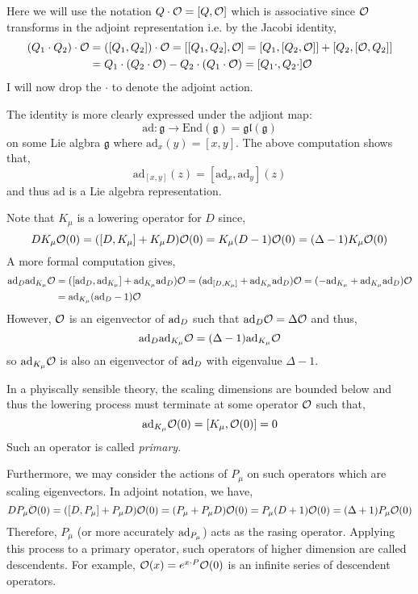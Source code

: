 \documentclass[12pt]{extarticle}
\begin{document}
Here we will use the notation $Q \cdot \mathcal{O} = [Q, \mathcal{O}]$ which is associative since $\mathcal{O}$ transforms in the adjoint representation i.e. by the Jacobi identity,
\begin{align*}
(Q_1 \cdot Q_2) \cdot \mathcal{O} & = ([Q_1, Q_2]) \cdot \mathcal{O} = [[Q_1, Q_2], \mathcal{O}] = [Q_1, [Q_2, \mathcal{O}]] + [Q_2, [\mathcal{O}, Q_2]] 
\\
& = Q_1 \cdot (Q_2 \cdot \mathcal{O}) -  Q_2 \cdot (Q_1 \cdot \mathcal{O}) = [Q_1 \cdot, Q_2 \cdot ] \mathcal{O}
\end{align*}
I will now drop the $\cdot$ to denote the adjoint action. 
\begin{remark}
The identity is more clearly expressed under the adjiont map:
\[ \mathrm{ad} : \mathfrak{g} \to \mathrm{End}(\mathfrak{g}) = \mathfrak{gl}(\mathfrak{g}) \]
on some Lie algbra $\mathfrak{g}$ where $\mathrm{ad}_x(y) = [x,y]$. The above computation shows that,
\[ \mathrm{ad}_{[x,y]}(z) = [\mathrm{ad}_x, \mathrm{ad}_y](z)  \]
and thus $\mathrm{ad}$ is a Lie algebra representation. 
\end{remark} 
Note that $K_\mu$ is a lowering operator for $D$ since,
\[ D K_\mu \mathcal{O}(0) = ([D, K_\mu] + K_\mu D) \mathcal{O}(0) = K_\mu (D - 1) \mathcal{O}(0) = (\Delta - 1) K_\mu \mathcal{O}(0) \]
A more formal computation gives,
\begin{align*}
\mathrm{ad}_{D} \mathrm{ad}_{K_\mu} \mathcal{O} & = ([\mathrm{ad}_{D}, \mathrm{ad}_{K_\mu}] + \mathrm{ad}_{K_\mu} \mathrm{ad}_{D}) \mathcal{O} = (\mathrm{ad}_{[D, K_\mu]} + \mathrm{ad}_{K_\mu} \mathrm{ad}_{D}) \mathcal{O} = (-\mathrm{ad}_{K_\mu} + \mathrm{ad}_{K_\mu} \mathrm{ad}_{D}) \mathcal{O}
\\
& = \mathrm{ad}_{K_\mu} (\mathrm{ad}_{D} - 1) \mathcal{O}
\end{align*}
However, $\mathcal{O}$ is an eigenvector of $\mathrm{ad}_{D}$ such that $\mathrm{ad}_{D} \mathcal{O} = \Delta \mathcal{O}$ and thus,
\[ \mathrm{ad}_{D} \mathrm{ad}_{K_\mu} \mathcal{O} = (\Delta - 1) \mathrm{ad}_{K_\mu} \mathcal{O} \]
so $\mathrm{ad}_{K_\mu} \mathcal{O}$ is also an eigenvector of $\mathrm{ad}_{D}$ with eigenvalue $\Delta - 1$. 
\begin{definition}
In a phyiscally sensible theory, the scaling dimensions are bounded below and thus the lowering process must terminate at some operator $\mathcal{O}$ such that,
\[ \mathrm{ad}_{K_\mu} \mathcal{O}(0) = [K_\mu, \mathcal{O}(0)] = 0 \]
Such an operator is called \textit{primary}. 
\end{definition}
Furthermore, we may consider the actions of $P_\mu$ on such operators which are scaling eigenvectors. In adjoint notation, we have,
\[ D P_\mu \mathcal{O}(0) = ([D, P_\mu] + P_\mu D) \mathcal{O}(0) = (P_\mu + P_\mu D) \mathcal{O}(0) = P_\mu (D + 1) \mathcal{O}(0) = (\Delta + 1) P_\mu \mathcal{O}(0) \]
Therefore, $P_\mu$ (or more accurately $\mathrm{ad}_{P_\mu}$) acts as the rasing operator. Applying this process to a primary operator, such operators of higher dimension are called descendents. For example, $\mathcal{O}(x) = e^{x \cdot P} \mathcal{O}(0)$ is an infinite series of descendent operators. 
\end{document}
